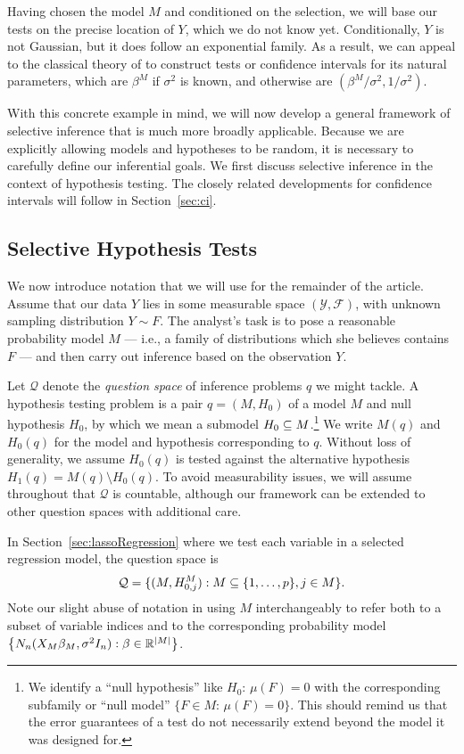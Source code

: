 \documentclass{article}
\theoremstyle{definition}
\newcommand{\cQ}{\mathcal{Q}}
\newcommand{\cY}{\mathcal{Y}}
\newcommand{\sF}{\mathscr{F}}
\begin{document}
Having chosen the model $M$ and conditioned on the selection, we will base our tests on the precise location of $Y$, which we do not know yet. Conditionally, $Y$ is not Gaussian, but it does follow an exponential family. As a result, we can appeal to the classical theory of \citet{lehmann1955completeness} to construct tests or confidence intervals for its natural parameters, which are $\beta^M$ if $\sigma^2$ is known, and otherwise are $(\beta^M/\sigma^2,1/\sigma^2)$.

With this concrete example in mind, we will now develop a general framework of selective inference that is much more broadly applicable.
Because we are explicitly allowing models and hypotheses to be random, it is necessary to carefully define our inferential goals.
We first discuss selective inference in the context of hypothesis testing. The closely related developments for confidence intervals will follow in Section~\ref{sec:ci}.

\subsection{Selective Hypothesis Tests}\label{sec:setting}

We now introduce notation that we will use for the remainder of the article. Assume that our data $Y$ lies in some measurable space $(\cY, \sF)$, with unknown sampling distribution $Y\sim F$. The analyst's task is to pose a reasonable probability model $M$ --- i.e., a family of distributions which she believes contains $F$ --- and then carry out inference based on the observation $Y$.

Let $\cQ$ denote the {\em question space} of inference problems $q$ we might tackle. A hypothesis testing problem is a pair $q=(M,H_0)$ of a model $M$ and null hypothesis $H_0$, by which we mean a submodel $H_0\subseteq M$.\footnote{We identify a ``null hypothesis'' like $H_0:\,\mu(F)=0$ with the corresponding subfamily or ``null model'' ${\{F\in M:\, \mu(F)=0\}}$. This should remind us that the error guarantees of a test do not necessarily extend beyond the model it was designed for.} We write $M(q)$ and $H_0(q)$ for the model and hypothesis corresponding to $q$. Without loss of generality, we assume $H_0(q)$ is tested against the alternative hypothesis $H_1(q)=M(q)\setminus H_0(q)$. To avoid measurability issues, we will assume throughout that $\cQ$ is countable, although our framework can be extended to other question spaces with additional care.

In Section~\ref{sec:lassoRegression} where we test each variable in a selected regression model, the question space is
\[ \cQ = \{ (M, H^M_{0, j}): M \sub \{1, \ldots, p\}, j \in M \}. \]
Note our slight abuse of notation in using $M$ interchangeably to refer both to a subset of variable indices and to the corresponding probability model $\left\{N_n(X_M\beta_M, \sigma^2I_n): \beta\in\mathbb{R}^{|M|}\right\}$.
\end{document}
